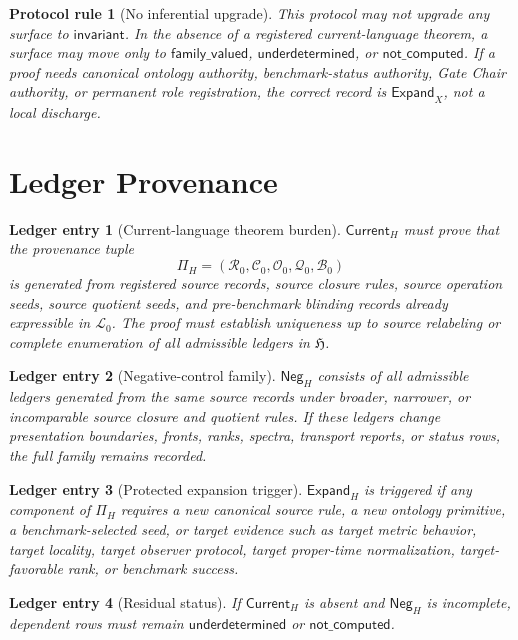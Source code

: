 \documentclass[11pt]{article}
\newcommand{\Lang}{\mathcal{L}_{0}}
\newcommand{\LedgerFam}{\mathfrak{H}}
\newcommand{\Neg}{\mathsf{Neg}}
\newcommand{\Current}{\mathsf{Current}}
\newcommand{\Expand}{\mathsf{Expand}}
\newtheorem{protocolrule}{Protocol rule}
\newtheorem{ledgerentry}{Ledger entry}
\begin{document}
\begin{protocolrule}[No inferential upgrade]
This protocol may not upgrade any surface to \(\mathsf{invariant}\). In the
absence of a registered current-language theorem, a surface may move only to
\(\mathsf{family\_valued}\), \(\mathsf{underdetermined}\), or
\(\mathsf{not\_computed}\). If a proof needs canonical ontology authority,
benchmark-status authority, Gate Chair authority, or permanent role
registration, the correct record is \(\Expand_X\), not a local discharge.
\end{protocolrule}

\section{Ledger Provenance}

\begin{ledgerentry}[Current-language theorem burden]
\(\Current_H\) must prove that the provenance tuple
\[
\Pi_H=(\mathcal{R}_{0},\mathcal{C}_{0},\mathcal{O}_{0},
\mathcal{Q}_{0},\mathcal{B}_{0})
\]
is generated from registered source records, source closure rules, source
operation seeds, source quotient seeds, and pre-benchmark blinding records
already expressible in \(\Lang\). The proof must establish uniqueness up to
source relabeling or complete enumeration of all admissible ledgers in
\(\LedgerFam\).
\end{ledgerentry}

\begin{ledgerentry}[Negative-control family]
\(\Neg_H\) consists of all admissible ledgers generated from the same source
records under broader, narrower, or incomparable source closure and quotient
rules. If these ledgers change presentation boundaries, fronts, ranks,
spectra, transport reports, or status rows, the full family remains recorded.
\end{ledgerentry}

\begin{ledgerentry}[Protected expansion trigger]
\(\Expand_H\) is triggered if any component of \(\Pi_H\) requires a new
canonical source rule, a new ontology primitive, a benchmark-selected seed,
or target evidence such as target metric behavior, target locality, target
observer protocol, target proper-time normalization, target-favorable rank,
or benchmark success.
\end{ledgerentry}

\begin{ledgerentry}[Residual status]
If \(\Current_H\) is absent and \(\Neg_H\) is incomplete, dependent rows must
remain \(\mathsf{underdetermined}\) or \(\mathsf{not\_computed}\).
\end{ledgerentry}
\end{document}
